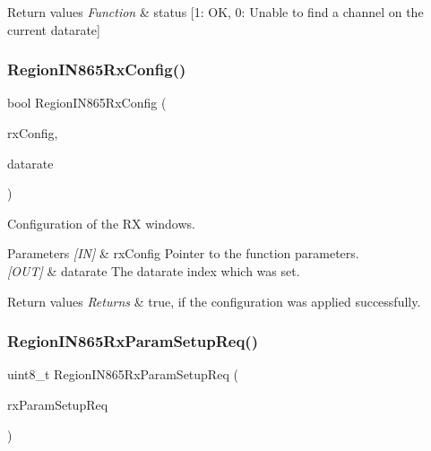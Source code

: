 \begin{DoxyRetVals}{Return values}
{\em Function} & status \mbox{[}1\+: OK, 0\+: Unable to find a channel on the current datarate\mbox{]} \\
\hline
\end{DoxyRetVals}
\mbox{\label{group__REGIONIN865_ga2d222860d58d1d5175f0486b572870c5}} 
\subsubsection{\texorpdfstring{Region\+I\+N865\+Rx\+Config()}{RegionIN865RxConfig()}}
{\footnotesize\ttfamily bool Region\+I\+N865\+Rx\+Config (\begin{DoxyParamCaption}\item[{\hyperlink{group__REGION_ga375c038078dfcfc7ef14280021db719e}{Rx\+Config\+Params\+\_\+t} $\ast$}]{rx\+Config,  }\item[{int8\+\_\+t $\ast$}]{datarate }\end{DoxyParamCaption})}



Configuration of the RX windows. 


\begin{DoxyParams}{Parameters}
{\em \mbox{[}\+I\+N\mbox{]}} & rx\+Config Pointer to the function parameters.\\
\hline
{\em \mbox{[}\+O\+U\+T\mbox{]}} & datarate The datarate index which was set.\\
\hline
\end{DoxyParams}

\begin{DoxyRetVals}{Return values}
{\em Returns} & true, if the configuration was applied successfully. \\
\hline
\end{DoxyRetVals}
\mbox{\label{group__REGIONIN865_gae9b5d8d395685af5802a07527f6cd3f3}} 
\subsubsection{\texorpdfstring{Region\+I\+N865\+Rx\+Param\+Setup\+Req()}{RegionIN865RxParamSetupReq()}}
{\footnotesize\ttfamily uint8\+\_\+t Region\+I\+N865\+Rx\+Param\+Setup\+Req (\begin{DoxyParamCaption}\item[{\hyperlink{group__REGION_ga7165f282c670c728c36d534df2285157}{Rx\+Param\+Setup\+Req\+Params\+\_\+t} $\ast$}]{rx\+Param\+Setup\+Req }\end{DoxyParamCaption})}



